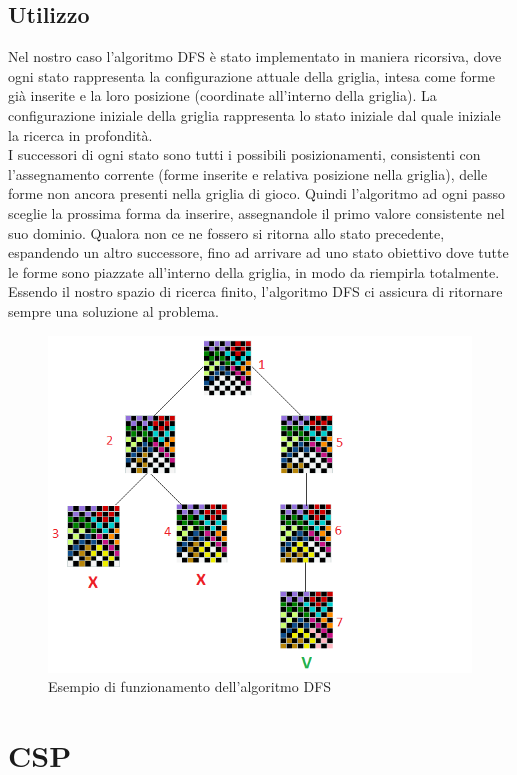 \subsection{Utilizzo}
Nel nostro caso l'algoritmo DFS è stato implementato in maniera ricorsiva, dove ogni stato rappresenta la configurazione attuale della griglia, intesa come forme già inserite e la loro posizione (coordinate all'interno della griglia). La configurazione iniziale della griglia rappresenta lo stato iniziale dal quale iniziale la ricerca in profondità.\\
I successori di ogni stato sono tutti i possibili posizionamenti, consistenti con l'assegnamento corrente (forme inserite e relativa posizione nella griglia), delle forme non ancora presenti nella griglia di gioco. Quindi l'algoritmo ad ogni passo sceglie la prossima forma da inserire, assegnandole il primo valore consistente nel suo dominio.
Qualora non ce ne fossero si ritorna allo stato precedente, espandendo un altro successore, fino ad arrivare ad uno stato obiettivo dove tutte le forme sono piazzate all'interno della griglia, in modo da riempirla totalmente.  \\
Essendo il nostro spazio di ricerca finito, l'algoritmo DFS ci assicura di ritornare sempre una soluzione al problema.
\begin{figure}[h]
	\centering
	\includegraphics[scale=1]{immagini/0}
	\caption{Esempio di funzionamento dell'algoritmo DFS}
	\label{fig:0}
\end{figure}

\section{CSP}

